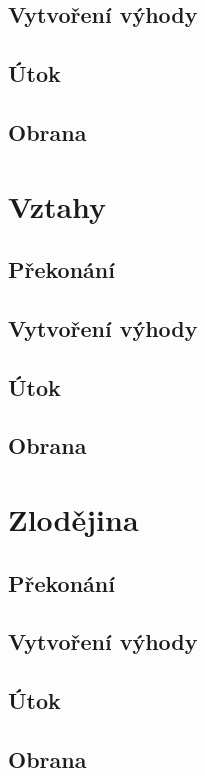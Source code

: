 \documentclass[../main.tex]{subfiles}
\begin{document}
\subsection*{Vytvoření výhody}
\label{subsec:vysetrovani-vytvoreni}
\vytvoreni

\subsection*{Útok}
\label{subsec:vysetrovani-utok}
\utok

\subsection*{Obrana}
\label{subsec:vysetrovani-obrana}
\obrana

\section{Vztahy}
\label{sec:vztahy}

\subsection*{Překonání}
\label{subsec:vztahy-prekonani}
\prekonani

\subsection*{Vytvoření výhody}
\label{subsec:vztahy-vytvoreni}
\vytvoreni

\subsection*{Útok}
\label{subsec:vztahy-utok}
\utok

\subsection*{Obrana}
\label{subsec:vztahy-obrana}
\obrana

\section{Zlodějina}
\label{sec:zlodejina}

\subsection*{Překonání}
\label{subsec:zlodejina-prekonani}
\prekonani

\subsection*{Vytvoření výhody}
\label{subsec:zlodejina-vytvoreni}
\vytvoreni

\subsection*{Útok}
\label{subsec:zlodejina-utok}
\utok

\subsection*{Obrana}
\label{subsec:zlodejina-obrana}
\obrana
\end{document}
